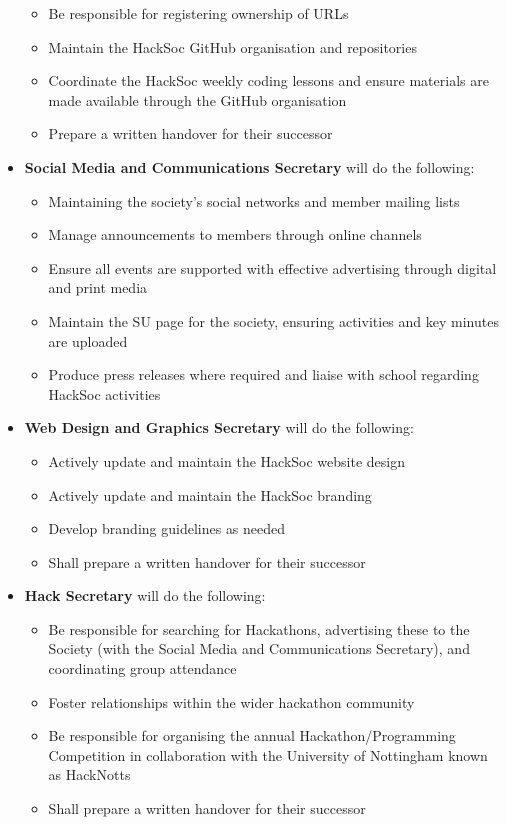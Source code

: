 \documentclass[a4paper,twoside,notitlepage,11pt]{article}
\begin{document}
\begin{itemize}
\begin{itemize}
	  \item Be responsible for registering ownership of URLs
	  \item Maintain the HackSoc GitHub organisation and repositories
	  \item Coordinate the HackSoc weekly coding lessons and ensure materials are made available through the GitHub organisation
	  \item Prepare a written handover for their successor
	\end{itemize}
	\item \textbf{Social Media and Communications Secretary} will do the following:
	\begin{itemize}
	  \item Maintaining the society's social networks and member mailing lists
	  \item Manage announcements to members through online channels
	  \item Ensure all events are supported with effective advertising through digital and print media
	  \item Maintain the SU page for the society, ensuring activities and key minutes are uploaded
	  \item Produce press releases where required and liaise with school regarding HackSoc activities
	\end{itemize}
	\item \textbf{Web Design and Graphics Secretary} will do the following:
	\begin{itemize}
	  \item Actively update and maintain the HackSoc website design
	  \item Actively update and maintain the HackSoc branding
	  \item Develop branding guidelines as needed
	  \item Shall prepare a written handover for their successor
	\end{itemize}
	\item \textbf{Hack Secretary} will do the following:
	\begin{itemize}
	  \item Be responsible for searching for Hackathons, advertising these to the Society (with the Social Media and Communications Secretary), and coordinating group attendance
	  \item Foster relationships within the wider hackathon community
	  \item Be responsible for organising the annual Hackathon/Programming Competition in collaboration with the University of Nottingham known as HackNotts
	  \item Shall prepare a written handover for their successor
	\end{itemize}

\end{itemize}
\end{document}
